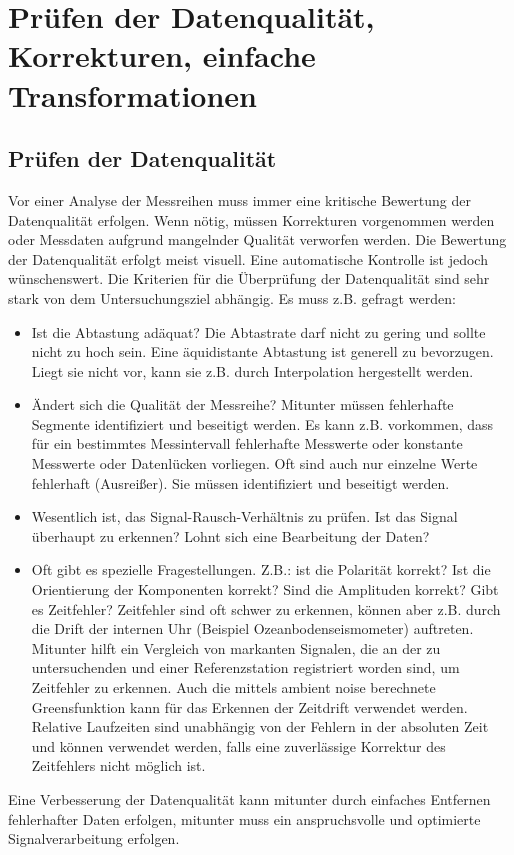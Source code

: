 \chapter{Prüfen der Datenqualität, Korrekturen, einfache Transformationen}
\section{Prüfen der Datenqualität}
Vor einer Analyse der Messreihen muss immer eine kritische Bewertung der Datenqualität erfolgen. Wenn nötig, müssen Korrekturen vorgenommen werden oder Messdaten aufgrund mangelnder Qualität verworfen werden. Die Bewertung der Datenqualität erfolgt meist visuell. Eine automatische Kontrolle ist jedoch wünschenswert. Die Kriterien für die Überprüfung der Datenqualität sind sehr stark von dem Untersuchungsziel abhängig. Es muss z.B. gefragt werden:
\begin{itemize}
\item
Ist die Abtastung adäquat? Die Abtastrate darf nicht zu gering und sollte nicht zu hoch sein. Eine äquidistante Abtastung ist generell zu bevorzugen. Liegt sie nicht vor, kann sie z.B. durch Interpolation hergestellt werden.
\item
Ändert sich die Qualität der Messreihe? Mitunter müssen fehlerhafte Segmente identifiziert und beseitigt werden. Es kann z.B. vorkommen, dass für ein bestimmtes Messintervall fehlerhafte Messwerte oder konstante Messwerte oder Datenlücken vorliegen. Oft sind auch nur einzelne Werte fehlerhaft (Ausreißer). Sie müssen identifiziert und beseitigt werden.
\item
Wesentlich ist, das Signal-Rausch-Verhältnis zu prüfen. Ist das Signal überhaupt zu erkennen? Lohnt sich eine Bearbeitung der Daten?
\item
Oft gibt es spezielle Fragestellungen. Z.B.: ist die Polarität korrekt? Ist die Orientierung der Komponenten korrekt? Sind die Amplituden korrekt? Gibt es Zeitfehler? Zeitfehler sind oft schwer zu erkennen, können aber z.B. durch die Drift der internen Uhr (Beispiel Ozeanbodenseismometer) auftreten. Mitunter hilft ein Vergleich von markanten Signalen, die an der zu untersuchenden und einer Referenzstation registriert worden sind, um Zeitfehler zu erkennen. Auch die mittels ambient noise berechnete Greensfunktion kann für das Erkennen der Zeitdrift verwendet werden. Relative Laufzeiten sind unabhängig von der Fehlern in der absoluten Zeit und können verwendet werden, falls eine zuverlässige Korrektur des Zeitfehlers nicht möglich ist.    
\end{itemize}
Eine Verbesserung der Datenqualität kann mitunter durch einfaches Entfernen fehlerhafter Daten erfolgen, mitunter muss ein anspruchsvolle und optimierte Signalverarbeitung erfolgen.  
